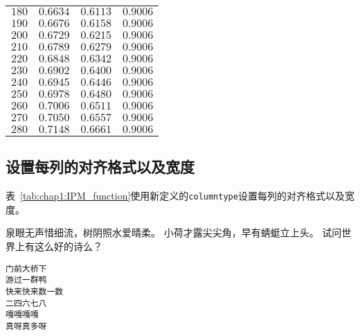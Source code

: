 \documentclass[../Main/thesis.tex]{subfiles}
\begin{document}
\begin{center}
\begin{supertabular}{C{3cm}C{3cm}C{3cm}C{3cm}}
    $180$                    & $0.6634$              & $0.6113$             & $0.9006$       \\

    $190$                    & $0.6676$              & $0.6158$             & $0.9006$       \\

    $200$                    & $0.6729$              & $0.6215$             & $0.9006$       \\

    $210$                    & $0.6789$              & $0.6279$             & $0.9006$       \\

    $220$                    & $0.6848$              & $0.6342$             & $0.9006$       \\

    $230$                    & $0.6902$              & $0.6400$             & $0.9006$      \\

    $240$  & $0.6945$& $0.6446$  & $0.9006$\\

    $250$  & $0.6978$& $0.6480$  & $0.9006$\\

    $260$  & $0.7006$& $0.6511$  & $0.9006$\\

    $270$  & $0.7050$& $0.6557$  & $0.9006$  \\

    $280$  & $0.7148$& $0.6661$  & $0.9006$  \\
  \end{supertabular}
\end{center}

\subsection{设置每列的对齐格式以及宽度}
表~\ref{tab:chap1:IPM_function}使用新定义的\texttt{columntype}设置每列的对齐格式以及宽度。

泉眼无声惜细流，树阴照水爱晴柔。
小荷才露尖尖角，早有蜻蜓立上头。
试问世界上有这么好的诗么？

\begin{verbatim}
门前大桥下
游过一群鸭
快来快来数一数
二四六七八
嘎嘎嘎嘎
真呀真多呀
\end{verbatim}
\end{document}
